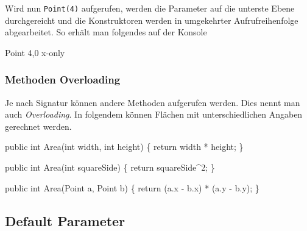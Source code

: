 \documentclass[
  9pt,
  a4paperpaper,
  DIV=11]{scrartcl}
\newenvironment{Shaded}{}{}
\newcommand{\DataTypeTok}[1]{\textcolor[rgb]{0.84,0.23,0.29}{#1}}
\newcommand{\DecValTok}[1]{\textcolor[rgb]{0.00,0.36,0.77}{#1}}
\newcommand{\FunctionTok}[1]{\textcolor[rgb]{0.44,0.26,0.76}{#1}}
\newcommand{\KeywordTok}[1]{\textcolor[rgb]{0.84,0.23,0.29}{#1}}
\newcommand{\NormalTok}[1]{\textcolor[rgb]{0.14,0.16,0.18}{#1}}
\newcommand{\OperatorTok}[1]{\textcolor[rgb]{0.14,0.16,0.18}{#1}}
\numberwithin{equation}{section}
\begin{document}
\begin{multicols}{2}
Wird nun \texttt{Point(4)} aufgerufen, werden die Parameter auf die
unterste Ebene durchgereicht und die Konstruktoren werden in umgekehrter
Aufrufreihenfolge abgearbeitet. So erhält man folgendes auf der Konsole

\begin{Shaded}
\begin{Highlighting}[]
\NormalTok{Point 4,0}
\NormalTok{x{-}only}
\end{Highlighting}
\end{Shaded}

\hypertarget{methoden-overloading}{%
\subsubsection{Methoden Overloading}\label{methoden-overloading}}

Je nach Signatur können andere Methoden aufgerufen werden. Dies nennt
man auch \emph{Overloading}. In folgendem können Flächen mit
unterschiedlichen Angaben gerechnet werden.

\begin{Shaded}
\begin{Highlighting}[]
\KeywordTok{public} \DataTypeTok{int} \FunctionTok{Area}\OperatorTok{(}\DataTypeTok{int}\NormalTok{ width}\OperatorTok{,} \DataTypeTok{int}\NormalTok{ height}\OperatorTok{)} \OperatorTok{\{}
  \KeywordTok{return}\NormalTok{ width }\OperatorTok{*}\NormalTok{ height}\OperatorTok{;}
\OperatorTok{\}}

\KeywordTok{public} \DataTypeTok{int} \FunctionTok{Area}\OperatorTok{(}\DataTypeTok{int}\NormalTok{ squareSide}\OperatorTok{)} \OperatorTok{\{}
  \KeywordTok{return}\NormalTok{ squareSide}\OperatorTok{\^{}}\DecValTok{2}\OperatorTok{;}
\OperatorTok{\}}

\KeywordTok{public} \DataTypeTok{int} \FunctionTok{Area}\OperatorTok{(}\NormalTok{Point a}\OperatorTok{,}\NormalTok{ Point b}\OperatorTok{)} \OperatorTok{\{}
  \KeywordTok{return} \OperatorTok{(}\NormalTok{a}\OperatorTok{.}\FunctionTok{x} \OperatorTok{{-}}\NormalTok{ b}\OperatorTok{.}\FunctionTok{x}\OperatorTok{)} \OperatorTok{*} \OperatorTok{(}\NormalTok{a}\OperatorTok{.}\FunctionTok{y} \OperatorTok{{-}}\NormalTok{ b}\OperatorTok{.}\FunctionTok{y}\OperatorTok{);}
\OperatorTok{\}}
\end{Highlighting}
\end{Shaded}

\hypertarget{default-parameter}{%
\subsection{Default Parameter}\label{default-parameter}}


\end{multicols}
\end{document}
